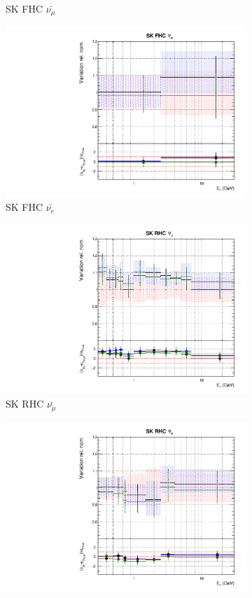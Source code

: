 \begin{figure}
\begin{subfigure}{0.24\textwidth}
  \caption{SK FHC $\bar{\nu_{\mu}}$}
\end{subfigure}
\begin{subfigure}{0.24\textwidth}
  \centering
  \includegraphics[width=0.95\linewidth]{figs/newolddatafitsflux_11}
  \caption{SK FHC $\bar{\nu_{e}}$}
\end{subfigure}
\begin{subfigure}{0.24\textwidth}
  \centering
  \includegraphics[width=0.95\linewidth]{figs/newolddatafitsflux_12}
  \caption{SK RHC $\bar{\nu_{\mu}}$}
\end{subfigure}
\begin{subfigure}{0.24\textwidth}
  \centering
  \includegraphics[width=0.95\linewidth]{figs/newolddatafitsflux_13}

\end{subfigure}
\end{figure}
